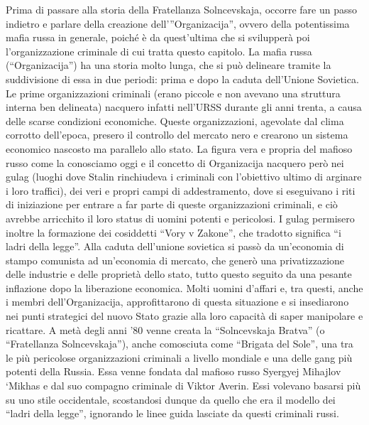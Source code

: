 \documentclass[a4paper, 11pt]{article}
\begin{document}


Prima di passare alla storia della Fratellanza Solncevskaja, occorre fare un passo indietro e parlare della creazione dell’”Organizacija”, ovvero della potentissima mafia russa in generale, poiché è da quest’ultima che si svilupperà poi l’organizzazione criminale di cui tratta questo capitolo.
La mafia russa (“Organizacija”) ha una storia molto lunga, che si può delineare tramite la suddivisione di essa in due periodi: prima e dopo la caduta dell’Unione Sovietica. Le prime organizzazioni criminali (erano piccole e non avevano una struttura interna ben delineata) nacquero infatti nell’URSS durante gli anni trenta, a causa delle scarse condizioni economiche. Queste organizzazioni, agevolate dal clima corrotto dell’epoca, presero il controllo del mercato nero e crearono un sistema economico nascosto ma parallelo allo stato. La figura vera e propria del mafioso russo come la conosciamo oggi e il concetto di Organizacija nacquero però nei gulag (luoghi dove Stalin rinchiudeva i criminali con l’obiettivo ultimo di arginare i loro traffici), dei veri e propri campi di addestramento, dove si eseguivano i riti di iniziazione per entrare a far parte di queste organizzazioni criminali, e ciò avrebbe arricchito il loro status di uomini potenti e pericolosi. I gulag permisero inoltre la formazione dei cosiddetti “Vory v Zakone”, che tradotto significa “i ladri della legge”. Alla caduta dell’unione sovietica si passò da un’economia di stampo comunista ad un’economia di mercato, che generò una privatizzazione delle industrie e delle proprietà dello stato, tutto questo seguito da una pesante inflazione dopo la liberazione economica. Molti uomini d’affari e, tra questi, anche i membri dell’Organizacija, approfittarono di questa situazione e si insediarono nei punti strategici del nuovo Stato grazie alla loro capacità di saper manipolare e ricattare. A metà degli anni ’80 venne creata la “Solncevskaja Bratva” (o “Fratellanza Solncevskaja”), anche comosciuta come “Brigata del Sole”, una tra le più pericolose organizzazioni criminali a livello mondiale e una delle gang più potenti della Russia. Essa venne fondata dal mafioso russo Syergyej Mihajlov ‘Mikhas e dal suo compagno criminale di Viktor Averin. Essi volevano basarsi più su uno stile occidentale, scostandosi dunque da quello che era il modello dei “ladri della legge”, ignorando le linee guida lasciate da questi criminali russi.
\end{document}
